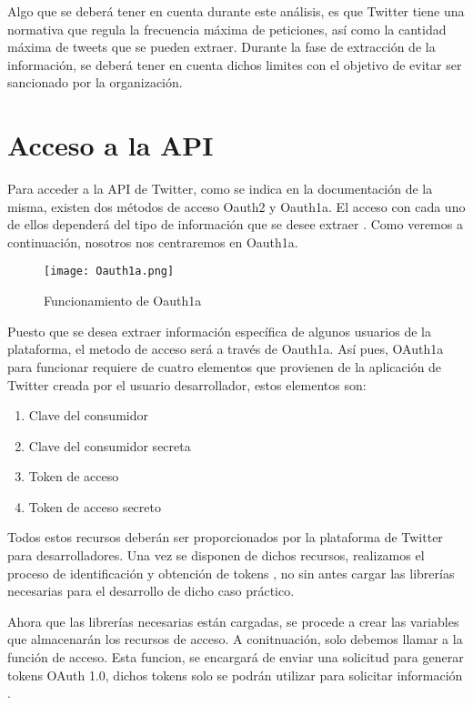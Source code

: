 Algo que se deberá tener en cuenta durante este análisis, es que Twitter tiene una normativa que regula 
la frecuencia máxima de peticiones, así como la cantidad máxima de tweets que se pueden extraer. Durante 
la fase de extracción de la información, se deberá tener en cuenta dichos limites con el objetivo de 
evitar ser sancionado por la organización.

\section{Acceso a la API}
\label{sec:acceso-api}

Para acceder a la API de Twitter, como se indica en la documentación de la misma, existen dos métodos de 
acceso Oauth2 y Oauth1a. El acceso con cada uno de ellos dependerá del tipo de información que se desee 
extraer \cite{oauth1a}. Como veremos a continuación, nosotros nos centraremos en Oauth1a.

\begin{figure}[tphb]
  		   \centering
     		   \texttt{[image: Oauth1a.png]}
  		   \caption{Funcionamiento de Oauth1a}
  		   \label{img:oauth1a}
\end{figure}

Puesto que se desea extraer información específica de algunos usuarios de la plataforma, el metodo de 
acceso será a través de Oauth1a. Así pues, OAuth1a para funcionar requiere 
de cuatro elementos que provienen de la aplicación de Twitter creada por el usuario desarrollador, estos elementos son:

\begin{enumerate}
\item Clave del consumidor
\item Clave del consumidor secreta
\item Token de acceso
\item Token de acceso secreto
\end{enumerate}


Todos estos recursos deberán ser proporcionados por la plataforma de Twitter para desarrolladores. Una 
vez se disponen de dichos recursos, realizamos el proceso de identificación y obtención de tokens \cite{error_oauth1a}, 
no sin antes cargar las librerías necesarias para el desarrollo de dicho caso práctico.



Ahora que las librerías necesarias están cargadas, se procede a crear las variables que almacenarán los 
recursos de acceso. A conitnuación, solo debemos llamar a la función de acceso. Esta funcion, se encargará de enviar 
una solicitud para generar tokens OAuth 1.0, dichos tokens solo se podrán utilizar para solicitar información \cite{create_token}.







